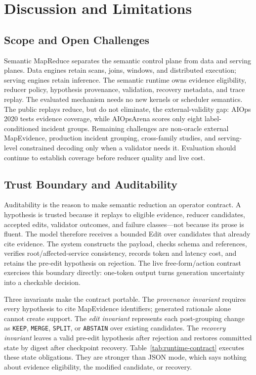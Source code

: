 \documentclass[sigplan,anonymous,nonacm]{acmart}
\newcommand{\systemname}{Semantic MapReduce}
\begin{document}
\section{Discussion and Limitations}
\label{sec:open-challenges}

\subsection{Scope and Open Challenges}

\systemname{} separates the semantic control plane from data and serving planes. Data engines retain scans, joins, windows, and distributed execution; serving engines retain inference. The semantic runtime owns evidence eligibility, reducer policy, hypothesis provenance, validation, recovery metadata, and trace replay. The evaluated mechanism needs no new kernels or scheduler semantics. The public replays reduce, but do not eliminate, the external-validity gap: AIOps 2020 tests evidence coverage, while AIOpsArena scores only eight label-conditioned incident groups. Remaining challenges are non-oracle external MapEvidence, production incident grouping, cross-family studies, and serving-level constrained decoding only when a validator needs it. Evaluation should continue to establish coverage before reducer quality and live cost.

\subsection{Trust Boundary and Auditability}

Auditability is the reason to make semantic reduction an operator contract. A hypothesis is trusted because it replays to eligible evidence, reducer candidates, accepted edits, validator outcomes, and failure classes---not because its prose is fluent. The model therefore receives a bounded \textsf{Edit} over candidates that already cite evidence. The system constructs the payload, checks schema and references, verifies root/affected-service consistency, records token and latency cost, and retains the pre-edit hypothesis on rejection. The live free-form/action contrast exercises this boundary directly: one-token output turns generation uncertainty into a checkable decision.

Three invariants make the contract portable. The \emph{provenance invariant} requires every hypothesis to cite \textsf{MapEvidence} identifiers; generated rationale alone cannot create support. The \emph{edit invariant} represents each post-grouping change as \texttt{KEEP}, \texttt{MERGE}, \texttt{SPLIT}, or \texttt{ABSTAIN} over existing candidates. The \emph{recovery invariant} leaves a valid pre-edit hypothesis after rejection and restores committed state by digest after checkpoint recovery. Table~\ref{tab:runtime-contract} executes these state obligations. They are stronger than JSON mode, which says nothing about evidence eligibility, the modified candidate, or recovery.
\end{document}
